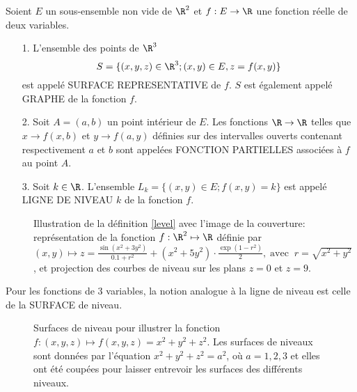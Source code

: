 \documentclass[class=report,crop=false]{standalone}
\begin{document}
\begin{definition}
\textcolor[rgb]{0.73,0.00,0.00}{
\noindent Soient $E$ un sous-ensemble non vide de $\R^2$  et $f:E \rightarrow \R$ une fonction  réelle de deux variables.
\begin{itemize}
\item[1.]L'ensemble des points de $\R^3$
\begin{equation*}
S=\lbrace (x,y,z) \in \R^3; (x,y) \in E, z=f(x,y) \rbrace
\end{equation*}
est appelé SURFACE REPRESENTATIVE de $f$. $S$ est également appelé GRAPHE de la fonction $f$.
\item[2.] Soit $A=(a,b)$ un point intérieur de $E$. Les fonctions $\R \rightarrow \R$ telles que  $x \rightarrow f(x,b)$ et $y \rightarrow f(a,y)$ définies sur des intervalles ouverts contenant respectivement
$a$ et $b$ sont appelées FONCTION PARTIELLES associées à $f$ au point $A$.
\item[3.]Soit $k \in \R$. L'ensemble $L_k=\lbrace (x,y) \in E; f(x,y)=k\rbrace$ est appelé LIGNE DE NIVEAU $k$ de la fonction $f$.
\end{itemize}\label{level}
}
\end{definition}

\begin{figure}[!h]
    \caption{Illustration de la définition \ref{level} avec l'image de la couverture: représentation de la fonction $f: \R^2 \mapsto \R$ définie par
  $(x,y) \mapsto z=\frac{\sin \left( x^{2}+3y^{2} \right)}{0.1+r^{2}}+\left( x^{2}+5y^{2} \right)\cdot \frac{\exp \left( 1-r^{2} \right)}{2},\;\mathrm{avec}\;\; r=\sqrt{x^{2}+y^{2}}$,
et projection des courbes de niveau sur les plans $z=0$ et $z=9$.}
      \label{fig:Contours2}
\end{figure}


\begin{remarque*}
\textcolor[rgb]{0.00,0.00,1.00}{
\noindent Pour les fonctions de 3 variables, la notion analogue à la ligne de niveau est celle
de la SURFACE de niveau.
\begin{figure}[!h]
    \caption{Surfaces de niveau pour illustrer la fonction $f: (x,y,z) \mapsto f(x,y,z)=x^2+y^2+z^2$. Les surfaces de niveaux sont données par l'équation $x^2+y^2+z^2=a^2$, où $a=1,2,3$ et elles ont été coupées pour laisser entrevoir les surfaces des différents niveaux.}
      \label{fig:levelsurfaces}
\end{figure}
}
\end{remarque*}
\end{document}
